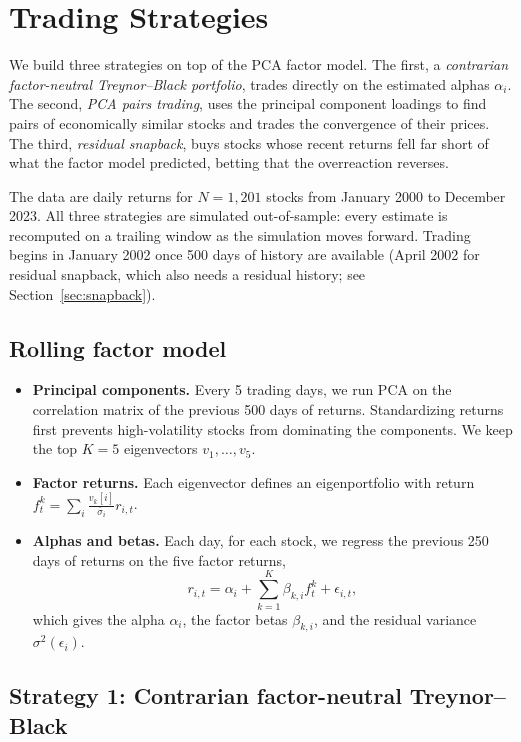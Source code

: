 \documentclass[12pt,letterpaper]{article}
\begin{document}


\section{Trading Strategies}

We build three strategies on top of the PCA factor model. The first, a \emph{contrarian factor-neutral Treynor--Black portfolio}, trades directly on the estimated alphas $\alpha_i$. The second, \emph{PCA pairs trading}, uses the principal component loadings to find pairs of economically similar stocks and trades the convergence of their prices. The third, \emph{residual snapback}, buys stocks whose recent returns fell far short of what the factor model predicted, betting that the overreaction reverses.

The data are daily returns for $N = 1{,}201$ stocks from January 2000 to December 2023. All three strategies are simulated out-of-sample: every estimate is recomputed on a trailing window as the simulation moves forward. Trading begins in January 2002 once 500 days of history are available (April 2002 for residual snapback, which also needs a residual history; see Section~\ref{sec:snapback}).

\subsection{Rolling factor model}

\begin{itemize}
    \item \textbf{Principal components.} Every 5 trading days, we run PCA on the correlation matrix of the previous 500 days of returns. Standardizing returns first prevents high-volatility stocks from dominating the components. We keep the top $K = 5$ eigenvectors $v_1, \dots, v_5$.
    \item \textbf{Factor returns.} Each eigenvector defines an eigenportfolio with return $f^k_t = \sum_i \frac{v_k[i]}{\bar\sigma_i} r_{i,t}$.
    \item \textbf{Alphas and betas.} Each day, for each stock, we regress the previous 250 days of returns on the five factor returns,
    \[
        r_{i,t} = \alpha_i + \sum_{k=1}^{K} \beta_{k,i} f^k_t + \epsilon_{i,t},
    \]
    which gives the alpha $\alpha_i$, the factor betas $\beta_{k,i}$, and the residual variance $\sigma^2(\epsilon_i)$.
\end{itemize}

\subsection{Strategy 1: Contrarian factor-neutral Treynor--Black}
\end{document}
